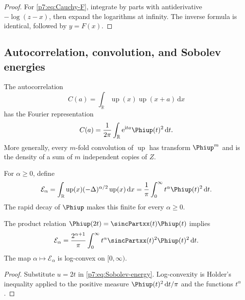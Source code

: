\documentclass[11pt,oneside]{article}
\theoremstyle{definition}
\theoremstyle{remark}
\newcommand{\Up}{\operatorname{up}}
\newcommand{\R}{\mathbb R}
\newcommand{\dd}{\,\mathrm d}
\newcommand{\e}{\mathrm e}
\newcommand{\ii}{\mathrm i}
\newcommand{\1}{\mathbf 1}
\begin{document}
\begin{proof}
For \cref{p7:eq:Cauchy-F}, integrate by parts with antiderivative $-\log(z-x)$, then expand the
logarithms at infinity.  The inverse formula is identical, followed by $y=F(x)$.
\end{proof}

\subsection{Autocorrelation, convolution, and Sobolev energies}

\begin{proposition}[Autocorrelation]
\label{p7:prop:autocorrelation}
The autocorrelation
\begin{equation}
 C(a)=\int_{\R}\Up(x)\Up(x+a)\dd x
 \label{p7:eq:autocorrelation-def}
\end{equation}
has the Fourier representation
\begin{equation}
 C(a)=\frac1{2\pi}\int_{\R}\e^{\ii ta}\Phiup(t)^2\dd t.
 \label{p7:eq:autocorrelation-Fourier}
\end{equation}
More generally, every $m$-fold convolution of $\Up$ has transform $\Phiup^m$ and is the
density of a sum of $m$ independent copies of $Z$.
\end{proposition}

\begin{definition}
For $\alpha\ge0$, define
\begin{equation}
 \mathcal E_\alpha
 =\int_{\R}\Up(x)(-\Delta)^{\alpha/2}\Up(x)\dd x
 =\frac1\pi\int_0^{\infty}t^\alpha\Phiup(t)^2\dd t.
 \label{p7:eq:Sobolev-energy}
\end{equation}
The rapid decay of $\Phiup$ makes this finite for every $\alpha\ge0$.
\end{definition}

\begin{proposition}
\label{p7:prop:energy-refinement}
The product relation $\Phiup(2t)=\sincPartxx(t)\Phiup(t)$ implies
\begin{equation}
 \mathcal E_\alpha
 =\frac{2^{\alpha+1}}\pi\int_0^{\infty}
 t^\alpha\sincPartxx(t)^2\Phiup(t)^2\dd t.
 \label{p7:eq:energy-refinement}
\end{equation}
The map $\alpha\mapsto\mathcal E_\alpha$ is log-convex on $[0,\infty)$.
\end{proposition}

\begin{proof}
Substitute $u=2t$ in \cref{p7:eq:Sobolev-energy}.  Log-convexity is Holder's inequality applied
to the positive measure $\Phiup(t)^2\dd t/\pi$ and the functions $t^\alpha$.
\end{proof}
\end{document}
